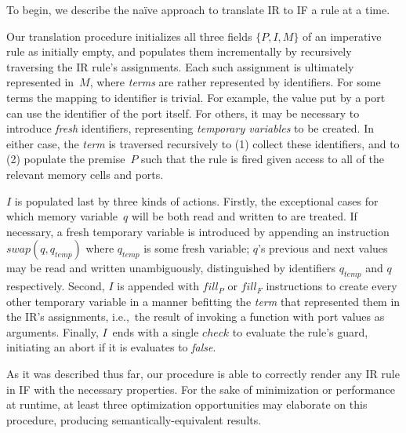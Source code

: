 To begin, we describe the na\"ive approach to translate IR to IF a rule at a time.

Our translation procedure initializes all three fields $\{P, I, M\}$ of an imperative rule as initially empty, and populates them incrementally by recursively traversing the IR rule's assignments. Each such assignment is ultimately represented in~$M$, where \textit{terms} are rather represented by identifiers. For some terms the mapping to identifier is trivial. For example, the value put by a port can use the identifier of the port itself. For others, it may be necessary to introduce \textit{fresh} identifiers, representing \textit{temporary variables} to be created. In either case, the \textit{term} is traversed recursively to (1) collect these identifiers, and to (2) populate the premise~$P$ such that the rule is fired given access to all of the relevant memory cells and ports.

$I$ is populated last by three kinds of actions. Firstly, the exceptional cases for which memory variable~$q$ will be both read and written to are treated. If necessary, a fresh temporary variable is introduced by appending an instruction $swap(q, q_{temp})$ where $q_{temp}$ is some fresh variable; $q$'s previous and next values may be read and written unambiguously, distinguished by identifiers $q_{temp}$ and $q$ respectively. Second, $I$ is appended with $fill_P$ or $fill_F$ instructions to create every other temporary variable in a manner befitting the \textit{term} that represented them in the IR's assignments, i.e.,\ the result of invoking a function with port values as arguments. Finally, $I$~ends with a single $check$ to evaluate the rule's guard, initiating an abort if it is evaluates to \textit{false}.

As it was described thus far, our procedure is able to correctly render any IR rule in IF with the necessary properties. For the sake of minimization or performance at runtime, at least three optimization opportunities may elaborate on this procedure, producing semantically-equivalent results.

